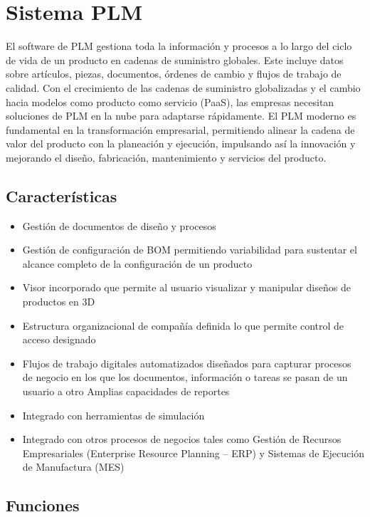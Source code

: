 \documentclass[12pt]{article}
\begin{document}
\section{Sistema PLM}

El software de PLM gestiona toda la información y procesos a lo largo del ciclo de vida de un producto en cadenas de suministro globales. Este incluye datos sobre artículos,
piezas, documentos, órdenes de cambio y flujos de trabajo de calidad. Con el crecimiento de las cadenas de suministro globalizadas y el cambio hacia modelos como producto 
como servicio (PaaS), las empresas necesitan soluciones de PLM en la nube para adaptarse rápidamente. El PLM moderno es fundamental en la transformación empresarial, 
permitiendo alinear la cadena de valor del producto con la planeación y ejecución, impulsando así la innovación y mejorando el diseño, fabricación, mantenimiento y servicios del producto.

\subsection{Características}
\begin{itemize}
    \item Gestión de documentos de diseño y procesos
    \item Gestión de configuración de BOM permitiendo variabilidad para sustentar el alcance completo de la configuración de un producto
    \item Visor incorporado que permite al usuario visualizar y manipular diseños de productos en 3D
    \item Estructura organizacional de compañía definida lo que permite control de acceso designado
    \item Flujos de trabajo digitales automatizados diseñados para capturar procesos de negocio en los que los documentos, información o tareas se pasan de un usuario a otro
    Amplias capacidades de reportes
    \item Integrado con herramientas de simulación
    \item Integrado con otros procesos de negocios tales como Gestión de Recursos Empresariales (Enterprise Resource Planning – ERP) y Sistemas de Ejecución de Manufactura (MES)
\end{itemize}

\subsection{Funciones}
\end{document}
